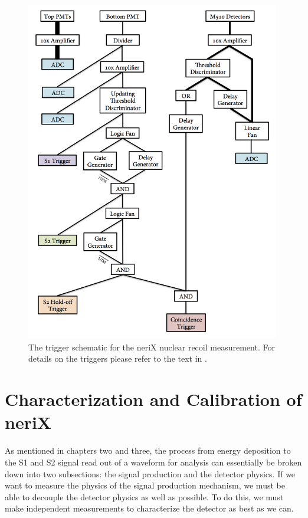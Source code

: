 \begin{figure}[p]
        \centering
	\includegraphics[width=0.99\textwidth]{nerix_daq_trigger_setup}
	\caption{The trigger schematic for the neriX nuclear recoil measurement.  For details on the triggers please refer to the text in .}
	\label{fig:nerix_daq_trigger_setup}
\end{figure}

\section{Characterization and Calibration of neriX}
\label{sec:nerix_cals}

As mentioned in chapters two and three, the process from energy deposition to the S1 and S2 signal read out of a waveform for analysis can essentially be broken down into two subsections: the signal production and the detector physics.  If we want to measure the physics of the signal production mechanism, we must be able to decouple the detector physics as well as possible.  To do this, we must make independent measurements to characterize the detector as best as we can.  

